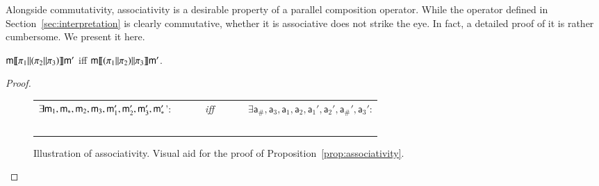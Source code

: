 \newcommand{\modla}{\mathsf a}
\newcommand{\readseta}{\mathsf {Rda}}
\newcommand{\writeseta}{\mathsf {Wra}}
\newcommand{\valuseta}{\mathsf {Va}}

Alongside commutativity, associativity is a desirable property of a parallel composition operator. While the operator defined in Section~\ref{sec:interpretation} is clearly commutative, whether it is associative does not strike the eye. In fact, a detailed proof of it is rather cumbersome. We present it here.

\begin{proposition}\label{prop:associativity}
$\mathsf m \llbracket  \pi_1 {||} (\pi_2 {||} \pi_3)  \rrbracket \mathsf m'$ iff $\mathsf m \llbracket  (\pi_1 {||} \pi_2) {||} \pi_3  \rrbracket \mathsf m'$.
\end{proposition}
\begin{proof}


  \begin{figure}[h]
    \centering
    \begin{tabular}{lcl}
      $\exists \mathsf m_1, \mathsf m_*, \mathsf m_2, \mathsf m_3, \mathsf m'_1, \mathsf m'_2, \mathsf m'_3, \mathsf m'_*$': &  ~~~~~\emph{iff}~~~~~&    $\exists \modla_\#, \modla_3, \modla_1, \modla_2, \modla_1', \modla_2', \modla_\#', \modla_3'$:\\
      
      & ~ &
      
    \end{tabular}
    \caption{\label{fig:illustration-associativity} Illustration of associativity. Visual aid for the proof of Proposition~\ref{prop:associativity}.}
  \end{figure}
  






\end{proof}
